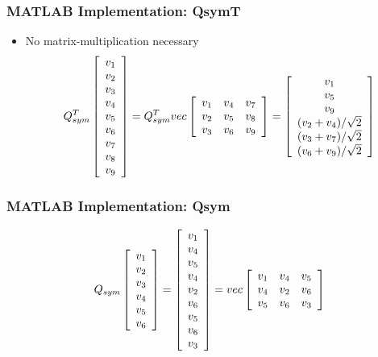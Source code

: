 \documentclass[bigger]{beamer}
\begin{document}
\begin{frame}
\frametitle{MATLAB Implementation: QsymT}
\label{sec-1-29}
\begin{itemize}

\item No matrix-multiplication necessary
\label{sec-1-29-1}%
\begin{align*}
Q_{sym}^T\left[\begin{array}{c}
v_1\\
v_2\\
v_3\\
v_4\\
v_5\\
v_6\\
v_7\\
v_8\\
v_9 \end{array} \right] = Q_{sym}^T vec\left[\begin{array}{c c c}
v_1 & v_4 & v_7\\
v_2 & v_5 & v_8\\
v_3 & v_6 & v_9\end{array}\right] = \left[\begin{array}{c}
v_1 \\
v_5 \\
v_9 \\
(v_2 + v_4)/\sqrt{2}\\
(v_3 + v_7)/\sqrt{2}\\
(v_6 + v_9)/\sqrt{2}
\end{array}\right]
\end{align*}
\end{itemize} %
\end{frame}
\begin{frame}
\frametitle{MATLAB Implementation: Qsym}
\label{sec-1-30}

\begin{align*}
Q_{sym}\left[\begin{array}{c}
v_1\\
v_2\\
v_3\\
v_4\\
v_5\\
v_6 \end{array} \right] = \left[\begin{array}{c}
v_1\\
v_4\\
v_5\\
v_4\\
v_2\\
v_6\\
v_5\\
v_6\\
v_3 \end{array} \right] = vec\left[\begin{array}{c c c}
v_1 & v_4 & v_5\\
v_4 & v_2 & v_6\\
v_5 & v_6 & v_3\end{array}\right]
\end{align*}
\end{frame}
\end{document}
